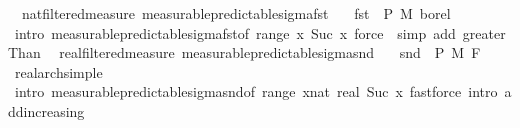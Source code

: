 \begin{isabellebody}
\endisatagproof
{\isafoldproof}%
%
\isadelimproof
\isanewline
%
\endisadelimproof
\isanewline
{}\isamarkupfalse%
\ {\isacharparenleft}{\kern0pt}\ nat{\isacharunderscore}{\kern0pt}filtered{\isacharunderscore}{\kern0pt}measure{\isacharparenright}{\kern0pt}\ measurable{\isacharunderscore}{\kern0pt}predictable{\isacharunderscore}{\kern0pt}sigma{\isacharunderscore}{\kern0pt}fst{\isacharcolon}{\kern0pt}\isanewline
\ \ \ {\isachardoublequoteopen}fst\ {\isasymin}\ {\isasymSigma}\isactrlsub P\ {\isasymrightarrow}\isactrlsub M\ borel{\isachardoublequoteclose}\isanewline
%
\isadelimproof
\ \ %
\endisadelimproof
%
\isatagproof
{}\isamarkupfalse%
\ {\isacharparenleft}{\kern0pt}intro\ measurable{\isacharunderscore}{\kern0pt}predictable{\isacharunderscore}{\kern0pt}sigma{\isacharunderscore}{\kern0pt}fst{\isacharbrackleft}{\kern0pt}of\ {\isachardoublequoteopen}range\ {\isacharparenleft}{\kern0pt}{\isasymlambda}x{\isachardot}{\kern0pt}\ {\isacharbraceleft}{\kern0pt}Suc\ x{\isacharbraceright}{\kern0pt}{\isacharparenright}{\kern0pt}{\isachardoublequoteclose}{\isacharbrackright}{\kern0pt}{\isacharparenright}{\kern0pt}\ {\isacharparenleft}{\kern0pt}force\ {\isacharbar}{\kern0pt}\ simp\ add{\isacharcolon}{\kern0pt}\ greaterThan{\isacharunderscore}{\kern0pt}{}{\isacharparenright}{\kern0pt}{\isacharplus}{\kern0pt}%
\endisatagproof
{\isafoldproof}%
%
\isadelimproof
\isanewline
%
\endisadelimproof
\isanewline
{}\isamarkupfalse%
\ {\isacharparenleft}{\kern0pt}\ real{\isacharunderscore}{\kern0pt}filtered{\isacharunderscore}{\kern0pt}measure{\isacharparenright}{\kern0pt}\ measurable{\isacharunderscore}{\kern0pt}predictable{\isacharunderscore}{\kern0pt}sigma{\isacharunderscore}{\kern0pt}snd{\isacharcolon}{\kern0pt}\isanewline
\ \ \ {\isachardoublequoteopen}snd\ {\isasymin}\ {\isasymSigma}\isactrlsub P\ {\isasymrightarrow}\isactrlsub M\ F\ {}{\isachardoublequoteclose}\isanewline
%
\isadelimproof
\ \ %
\endisadelimproof
%
\isatagproof
{}\isamarkupfalse%
\ real{\isacharunderscore}{\kern0pt}arch{\isacharunderscore}{\kern0pt}simple\ \isamarkupfalse%
\ {\isacharparenleft}{\kern0pt}intro\ measurable{\isacharunderscore}{\kern0pt}predictable{\isacharunderscore}{\kern0pt}sigma{\isacharunderscore}{\kern0pt}snd{\isacharbrackleft}{\kern0pt}of\ {\isachardoublequoteopen}range\ {\isacharparenleft}{\kern0pt}{\isasymlambda}x{\isacharcolon}{\kern0pt}{\isacharcolon}{\kern0pt}nat{\isachardot}{\kern0pt}\ {\isacharbraceleft}{\kern0pt}{}{\isacharless}{\kern0pt}{\isachardot}{\kern0pt}{\isachardot}{\kern0pt}real\ {\isacharparenleft}{\kern0pt}Suc\ x{\isacharparenright}{\kern0pt}{\isacharbraceright}{\kern0pt}{\isacharparenright}{\kern0pt}{\isachardoublequoteclose}{\isacharbrackright}{\kern0pt}{\isacharparenright}{\kern0pt}\ {\isacharparenleft}{\kern0pt}fastforce\ intro{\isacharcolon}{\kern0pt}\ add{\isacharunderscore}{\kern0pt}increasing{\isacharparenright}{\kern0pt}{\isacharplus}{\kern0pt}%

\end{isabellebody}
